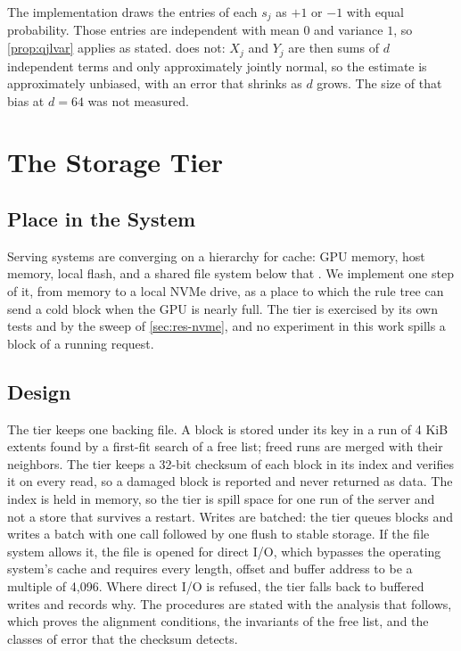 The implementation draws the entries of each $s_j$ as $+1$ or $-1$ with
equal probability. Those entries are independent with mean $0$ and variance
$1$, so \cref{prop:qjlvar} applies as stated.  does not:
$X_j$ and $Y_j$ are then sums of $d$ independent terms and only approximately
jointly normal, so the estimate is approximately unbiased, with an error
that shrinks as $d$ grows. The size of that bias at $d = 64$ was not
measured.

\section{The Storage Tier}
\label{sec:tier}

\subsection{Place in the System}

Serving systems are converging on a hierarchy for cache: GPU memory, host
memory, local flash, and a shared file system below that
\citep{hsu2026fourtier,hsu2026kv,ibm2025storage}. We implement one step of it, from memory to a local NVMe drive, as a place to
which the rule tree can send a cold block when the GPU is nearly full. The
tier is exercised by its own tests and by the sweep of \cref{sec:res-nvme},
and no experiment in this work spills a block of a running request.

\subsection{Design}

The tier keeps one backing file. A block is stored under its key in a run of
4 KiB extents found by a first-fit search of a free list; freed runs are
merged with their neighbors. The tier keeps a 32-bit checksum of each block
in its index and verifies it on every read, so a damaged block is reported
and never returned as data. The index is held in memory, so the tier is
spill space for one run of the server and not a store that survives a
restart. Writes are batched: the tier queues blocks and writes a
batch with one call followed by one flush to stable storage. If the file
system allows it, the file is opened for direct I/O, which bypasses the
operating system's cache and requires every length, offset and buffer address
to be a multiple of 4,096. Where direct I/O is refused, the tier falls back
to buffered writes and records why. The procedures are stated with the
analysis that follows, which proves the alignment conditions, the invariants
 of the free list, and the classes of error that the checksum detects.


